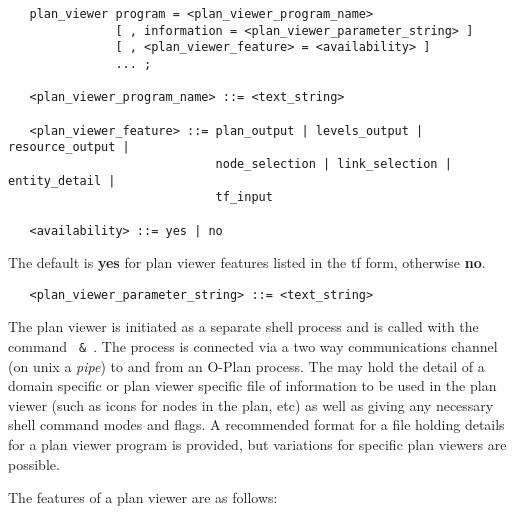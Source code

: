 \begin{verbatim}
   plan_viewer program = <plan_viewer_program_name>
               [ , information = <plan_viewer_parameter_string> ]
               [ , <plan_viewer_feature> = <availability> ]
               ... ;

   <plan_viewer_program_name> ::= <text_string>

   <plan_viewer_feature> ::= plan_output | levels_output | resource_output |
                             node_selection | link_selection | entity_detail |
                             tf_input

   <availability> ::= yes | no
\end{verbatim}

The default is {\bf yes} for plan viewer features
listed in the {\sc tf} form, otherwise {\bf no}.

\begin{verbatim}
   <plan_viewer_parameter_string> ::= <text_string>
\end{verbatim}

The plan viewer is initiated as a separate shell process and is called
with the command {\tt {}
 \& }.  The process is connected
via a two way communications channel (on {\sc unix} a {\em pipe}) to and
from an O-Plan process.  The  may
hold the detail of a domain specific or plan viewer specific file of
information to be used in the plan viewer (such as icons for nodes in
the plan, etc) as well as giving any necessary shell command modes and
flags.  A recommended format for a file holding details for a
plan viewer program is provided, but variations for specific plan viewers
are possible. 

The features of a plan viewer are as follows:


